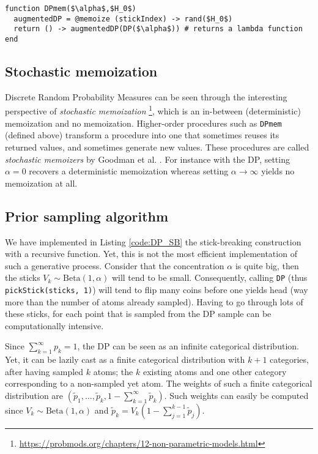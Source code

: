 \begin{lstlisting}[caption={\acrlong{DP} with base distribution $H_0$ written in Julia.},captionpos=b,label=code:DP]
function DPmem($\alpha$,$H_0$)
  augmentedDP = @memoize (stickIndex) -> rand($H_0$)
  return () -> augmentedDP(DP($\alpha$)) # returns a lambda function
end
\end{lstlisting}

\subsection{Stochastic memoization}
Discrete Random Probability Measures can be seen through the interesting perspective of \textit{stochastic memoization} \footnote{\url{https://probmods.org/chapters/12-non-parametric-models.html}}, which is an in-between (deterministic) memoization and no memoization.
Higher-order procedures such as \texttt{DPmem} (defined above) transform a procedure into one that sometimes reuses its returned values, and sometimes generate new values. These procedures are called \textit{stochastic memoizers} by Goodman et al. \cite{Goodman:2012uq}.
For instance with the \gls{DP}, setting $\alpha = 0$ recovers a deterministic memoization whereas setting $\alpha \rightarrow \infty$ yields no memoization at all.

\subsection{Prior sampling algorithm}
We have implemented in Listing \ref{code:DP_SB} the stick-breaking construction with a recursive function. Yet, this is not the most efficient implementation of such a generative process. Consider that the concentration $\alpha$ is quite big, then the sticks $V_k \sim \text{Beta}(1, \alpha)$ will tend to be small. Consequently, calling \texttt{DP} (thus \texttt{pickStick(sticks, 1)}) will tend to flip many coins before one yields head (way more than the number of atoms already sampled). Having to go through lots of these sticks, for each point that is sampled from the \gls{DP} sample can be computationally intensive.

Since $\sum_{k=1}^\infty{p_k} = 1$, the \gls{DP} can be seen as an infinite categorical distribution. Yet, it can be lazily cast as a finite categorical distribution with $k+1$ categories, after having sampled $k$ atoms; the $k$ existing atoms and one other category corresponding to a non-sampled yet atom. The weights of such a finite categorical distribution are $(\tilde{p}_1, \dots, \tilde{p}_k, 1-\sum_{k=1}^\infty{\tilde{p}_k})$. Such weights can easily be computed since $V_k \sim \text{Beta}(1, \alpha)$ and $\tilde{p}_k = V_k  (1-\sum_{j=1}^{k-1}{\tilde{p}_j})$.

